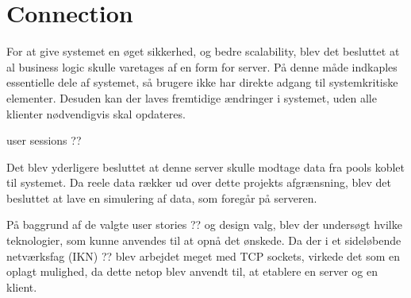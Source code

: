 \section{Connection}\label{sec:designconnection}

For at give systemet en øget sikkerhed, og bedre scalability, blev det besluttet at al business logic skulle varetages af en form for server. På denne måde indkaples essentielle dele af systemet, så brugere ikke har direkte adgang til systemkritiske elementer. Desuden kan der laves fremtidige ændringer i systemet, uden alle klienter nødvendigvis skal opdateres.

user sessions ??

Det blev yderligere besluttet at denne server skulle modtage data fra pools koblet til systemet. Da reele data rækker ud over dette projekts afgrænsning, blev det besluttet at lave en simulering af data, som foregår på serveren.

På baggrund af de valgte user stories ?? og design valg, blev der undersøgt hvilke teknologier, som kunne anvendes til at opnå det ønskede. Da der i et sideløbende netværksfag (IKN) ?? blev arbejdet meget med TCP sockets, virkede det som en oplagt mulighed, da dette netop blev anvendt til, at etablere en server og en klient.
